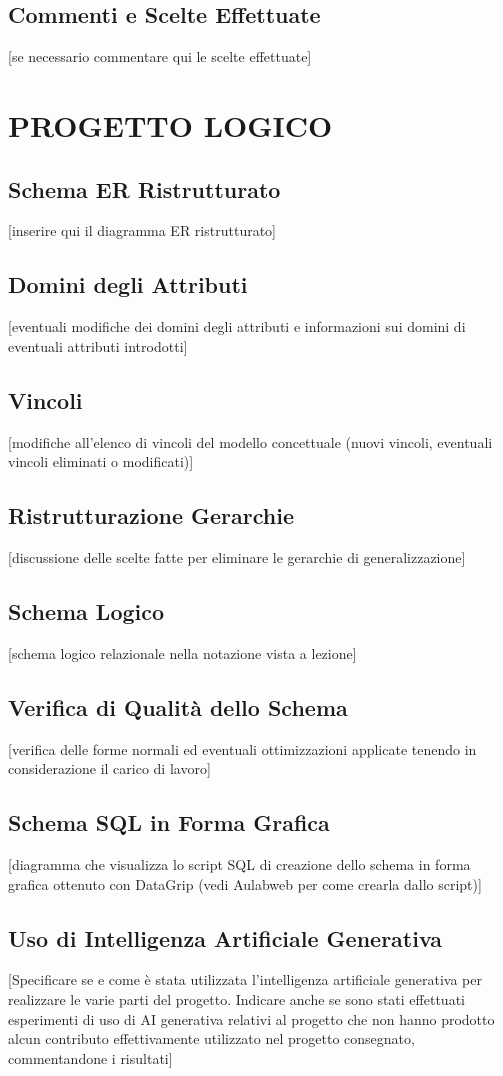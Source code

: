 \documentclass[a4paper,12pt]{article}
\begin{document}
\subsection{Commenti e Scelte Effettuate}
[se necessario commentare qui le scelte effettuate]

\newpage
\section{PROGETTO LOGICO}
\subsection{Schema ER Ristrutturato}
[inserire qui il diagramma ER ristrutturato]

\subsection{Domini degli Attributi}
[eventuali modifiche dei domini degli attributi e informazioni sui domini di eventuali attributi introdotti]

\subsection{Vincoli}
[modifiche all'elenco di vincoli del modello concettuale (nuovi vincoli, eventuali vincoli eliminati o modificati)]

\subsection{Ristrutturazione Gerarchie}
[discussione delle scelte fatte per eliminare le gerarchie di generalizzazione]

\subsection{Schema Logico}
[schema logico relazionale nella notazione vista a lezione]

\subsection{Verifica di Qualità dello Schema}
[verifica delle forme normali ed eventuali ottimizzazioni applicate tenendo in considerazione il carico di lavoro]

\subsection{Schema SQL in Forma Grafica}
[diagramma che visualizza lo script SQL di creazione dello schema in forma grafica ottenuto con DataGrip (vedi Aulabweb per come crearla dallo script)]

\subsection{Uso di Intelligenza Artificiale Generativa}
[Specificare se e come è stata utilizzata l’intelligenza artificiale generativa per realizzare le varie parti del progetto. Indicare anche se sono stati effettuati esperimenti di uso di AI generativa relativi al progetto che non hanno prodotto alcun contributo effettivamente utilizzato nel progetto consegnato, commentandone i risultati]
\end{document}
